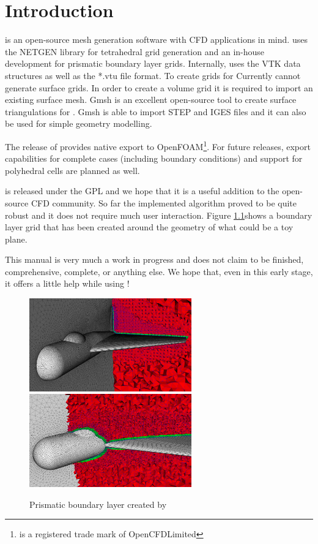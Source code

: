\chapter{Introduction}

\eg is an open-source mesh generation software with CFD applications in mind.
\eg uses the NETGEN \cite{netgen:2008} library for tetrahedral grid generation
and an in-house development for prismatic boundary layer grids. Internally, \eg
uses the VTK \cite{vtk:2008} data structures as well as the {*}.vtu file format.
To create grids for
Currently \eg cannot generate surface grids. In order to create a volume grid it
is required to import an existing surface mesh. Gmsh \cite{gmsh:2008} is an
excellent open-source tool to create surface triangulations for \eg. Gmsh is
able to import STEP and IGES files and it can also be used for simple geometry
modelling. 

The \egv release of \eg provides native export to
OpenFOAM\textsuperscript{\textregistered}\footnote{\foam is a registered trade
mark of OpenCFD\textregistered Limited}\cite{openfoam:2008}. For future
releases, export capabilities for complete \foam cases (including boundary
conditions) and support for polyhedral cells are planned as well.

\eg is released under the GPL and we hope that it is a useful addition to the
open-source CFD community. So far the implemented algorithm proved to be quite
robust and it does not require much user interaction. Figure
\ref{fig:Introduction1}shows a boundary layer grid that has been created around
the geometry of what could be a toy plane.

\important
{
  This manual is very much a work in progress and does
  not claim to be finished, comprehensive, complete, or anything else.
  We hope that, even in this early stage, it offers a little help while
  using \eg!
}


\begin{figure}
\begin{centering}
\includegraphics[width=7cm]{figures/DeltaWing_02}
\hspace{2mm}
\includegraphics[width=7cm]{figures/DeltaWing_01}\\
\end{centering}
\caption{Prismatic boundary layer created by \eg}
\label{fig:Introduction1}
\end{figure}

